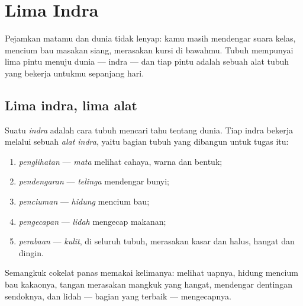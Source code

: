 \chapter{Lima Indra}\label{ch:g1:the-five-senses}

Pejamkan matamu dan dunia tidak lenyap: kamu masih mendengar suara
kelas, mencium bau masakan siang, merasakan kursi di bawahmu. Tubuh
mempunyai lima pintu menuju dunia --- indra --- dan tiap pintu adalah
sebuah alat tubuh yang bekerja untukmu sepanjang hari.

\section{Lima indra, lima alat}

\begin{definition}\label{def:g1:the-five-senses:sense}
Suatu \emph{indra} adalah cara tubuh mencari tahu tentang
dunia. Tiap indra bekerja melalui sebuah \emph{alat
indra}, yaitu bagian tubuh yang dibangun untuk tugas
itu:
\begin{enumerate}
  \item \emph{penglihatan} --- \emph{mata}
        melihat cahaya, warna dan bentuk;
  \item \emph{pendengaran} --- \emph{telinga}
        mendengar bunyi;
  \item \emph{penciuman} --- \emph{hidung}
        mencium bau;
  \item \emph{pengecapan} --- \emph{lidah}
        mengecap makanan;
  \item \emph{perabaan} --- \emph{kulit},
        di seluruh tubuh, merasakan kasar dan halus, hangat dan dingin.
\end{enumerate}
\end{definition}

\begin{example}\label{ex:g1:the-five-senses:breakfast}
Semangkuk cokelat panas memakai kelimanya:  melihat uapnya, hidung
mencium bau kakaonya,  tangan merasakan mangkuk yang hangat,
 mendengar dentingan sendoknya, dan lidah --- bagian yang
terbaik --- mengecapnya.
\end{example}


